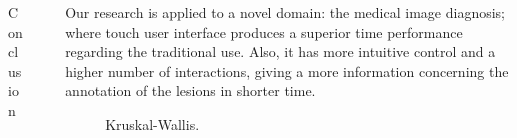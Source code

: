 \documentclass[final]{beamer}
\newlength{\sepwid}
\newlength{\onecolwid}
\begin{document}
\begin{frame}[t]
\begin{columns}[t]
\begin{column}{\onecolwid}
\begin{block}{Conclusion}
\end{block}

\end{column}



\begin{column}{\sepwid}  \end{column}




\begin{column}{\onecolwid} %

\begin{block}{ }

Our research is applied to a novel domain: the medical image diagnosis; where touch user interface produces a superior time performance regarding  the traditional use. Also, it has more intuitive control and a higher number of interactions, giving a more information concerning the annotation of the lesions in shorter time.

\begin{figure}
\caption{Kruskal-Wallis.}
\label{fig:Fig8}
\end{figure}


\end{block}
\end{column}
\end{columns}
\end{frame}
\end{document}
